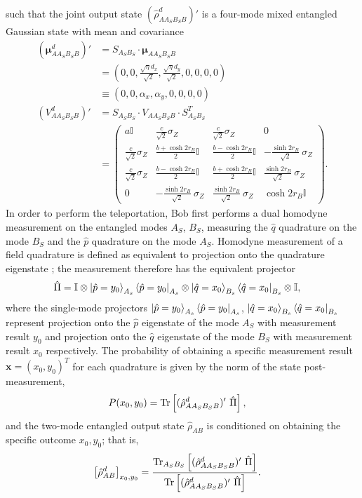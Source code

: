 \documentclass[%
 reprint,
 superscriptaddress,
 amsmath,
 amssymb,
 aps,
 pra,
]{revtex4-2}
\newcommand{\id}{\mathbb{I}}
\newcommand{\sz}{\sigma_Z}
\begin{document}
\begin{widetext}
such that the joint output state $(\hat \rho_{AA_SB_SB}^d)'$ is a four-mode mixed entangled Gaussian state with mean and covariance
\begin{align}
    (\bm{\mu}_{AA_SB_SB}^d)' &= S_{A_SB_S} \cdot \bm{\mu}_{AA_SB_SB} \\
    &= (0,0, \frac{\sqrt{\eta}d_x}{\sqrt{2}}, \frac{\sqrt{\eta}d_y}{\sqrt{2}}, 0, 0, 0,0) \\
    &\equiv (0,0, \alpha_x, \alpha_y, 0, 0, 0,0) \\
    (V_{AA_SB_SB}^d)' &= S_{A_SB_S} \cdot V_{AA_SB_SB} \cdot S_{A_SB_S}^T \\
    &= \begin{pmatrix}
            a \id & \frac{c}{\sqrt{2}} \sz & \frac{c}{\sqrt{2}} \sz & 0 \\
            \frac{c}{\sqrt{2}} \sz & \frac{b+\cosh2r_B}{2} \id & \frac{b-\cosh2r_B}{2} \id & -\frac{\sinh 2r_B}{\sqrt{2}} \ \sz \\
            \frac{c}{\sqrt{2}} \sz & \frac{b-\cosh 2r_B}{2} \id & \frac{b+\cosh 2r_B}{2} \id & \frac{\sinh 2r_B}{\sqrt{2}} \ \sz \\
            0 & -\frac{\sinh 2r_B}{\sqrt{2}} \ \sz & \frac{\sinh 2r_B}{\sqrt{2}} \ \sz & \cosh 2r_B \id
        \end{pmatrix}.
\end{align}
In order to perform the teleportation, Bob first performs a dual homodyne measurement on the entangled modes $A_S$, $B_S$, measuring the $\hat q$ quadrature on the mode $B_S$ and the $\hat p$ quadrature on the mode $A_S$. Homodyne measurement of a field quadrature is defined as equivalent to projection onto the quadrature eigenstate \cite{eisert_distilling_2002}; the measurement therefore has the equivalent projector
\begin{align}
    \hat \Pi &= \id \otimes \ket{\hat p = y_0}_{A_s}\bra{\hat p = y_0}_{A_s} \otimes \ket{\hat q = x_0}_{B_s}\bra{\hat q = x_0}_{B_s} \otimes \id,
\end{align}
where the single-mode projectors $\ket{\hat p = y_0}_{A_s}\bra{\hat p = y_0}_{A_s}$, $\ket{\hat q = x_0}_{B_s}\bra{\hat q = x_0}_{B_s}$ represent projection onto the $\hat p$ eigenstate of the mode $A_S$ with measurement result $y_0$ and projection onto the $\hat q$ eigenstate of the mode $B_S$ with measurement result $x_0$ respectively. The probability of obtaining a specific measurement result $\bm{x} = (x_0, y_0)^T$ for each quadrature is given by the norm of the state post-measurement,
\begin{align}
    P(x_0, y_0) &= \Tr \left[ (\hat \rho_{AA_SB_SB}^d)' \ \hat \Pi \right],
\end{align}
and the two-mode entangled output state $\hat \rho_{AB}$ is conditioned on obtaining the specific outcome $x_0, y_0$; that is,
\begin{align}
    \left[ \hat \rho_{AB}^d \right]_{x_0, y_0} &= \frac{\Tr_{A_SB_S} \left[ (\hat \rho_{AA_SB_SB}^d)' \ \hat \Pi \right]}{\Tr \left[ (\hat \rho_{AA_SB_SB}^d)' \ \hat \Pi \right]}.
\end{align}


\end{widetext}
\end{document}
